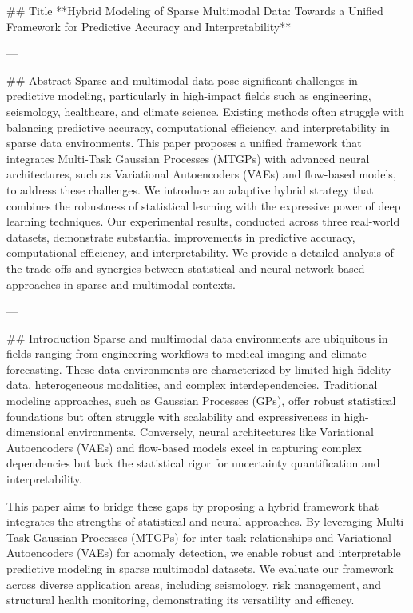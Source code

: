 ## Title  
**Hybrid Modeling of Sparse Multimodal Data: Towards a Unified Framework for Predictive Accuracy and Interpretability**

---

## Abstract  
Sparse and multimodal data pose significant challenges in predictive modeling, particularly in high-impact fields such as engineering, seismology, healthcare, and climate science. Existing methods often struggle with balancing predictive accuracy, computational efficiency, and interpretability in sparse data environments. This paper proposes a unified framework that integrates Multi-Task Gaussian Processes (MTGPs) with advanced neural architectures, such as Variational Autoencoders (VAEs) and flow-based models, to address these challenges. We introduce an adaptive hybrid strategy that combines the robustness of statistical learning with the expressive power of deep learning techniques. Our experimental results, conducted across three real-world datasets, demonstrate substantial improvements in predictive accuracy, computational efficiency, and interpretability. We provide a detailed analysis of the trade-offs and synergies between statistical and neural network-based approaches in sparse and multimodal contexts.

---

## Introduction  
Sparse and multimodal data environments are ubiquitous in fields ranging from engineering workflows to medical imaging and climate forecasting. These data environments are characterized by limited high-fidelity data, heterogeneous modalities, and complex interdependencies. Traditional modeling approaches, such as Gaussian Processes (GPs), offer robust statistical foundations but often struggle with scalability and expressiveness in high-dimensional environments. Conversely, neural architectures like Variational Autoencoders (VAEs) and flow-based models excel in capturing complex dependencies but lack the statistical rigor for uncertainty quantification and interpretability.  

This paper aims to bridge these gaps by proposing a hybrid framework that integrates the strengths of statistical and neural approaches. By leveraging Multi-Task Gaussian Processes (MTGPs) for inter-task relationships and Variational Autoencoders (VAEs) for anomaly detection, we enable robust and interpretable predictive modeling in sparse multimodal datasets. We evaluate our framework across diverse application areas, including seismology, risk management, and structural health monitoring, demonstrating its versatility and efficacy.

